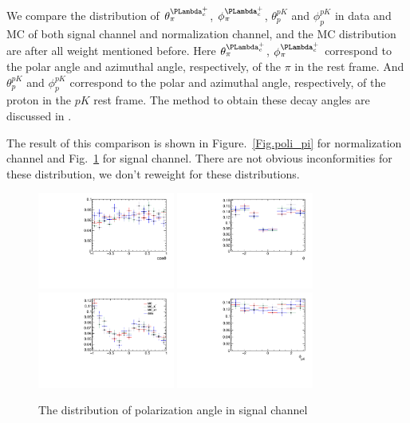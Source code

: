 We compare the distribution of $\theta_{\pi}^{\Lc}$, $\phi_{\pi}^{\Lc}$, $\theta_{p}^{pK}$ and $\phi_{p}^{pK}$ 
in data and MC of both signal channel and normalization channel, 
and the MC distribution are after all weight mentioned before. 
Here $\theta_{\pi}^{\Lc}$, $\phi_{\pi}^{\Lc}$ correspond to the polar angle and azimuthal angle, 
respectively, of the $\pi$ in the \Lc rest frame. 
And $\theta_{p}^{pK}$ and $\phi_{p}^{pK}$ correspond to the polar and azimuthal angle, respectively, 
of the proton in the $pK$ rest frame. 
The method to obtain these decay angles are discussed in \cite{LHCb-PAPER-2015-029}.

The result of this comparison is shown in Figure.~\ref{Fig.poli_pi} for normalization channel and Fig.~\ref{Fig.poli_kkpi} for signal channel. 
There are not obvious inconformities for these distribution, we don't reweight for these distributions.

\begin{figure}[bth]
\centering
\includegraphics[width=0.4\textwidth]{Figures/05_open_charm/04_tune/poli/kkpi_poli/cosTheta.pdf}%
\includegraphics[width=0.4\textwidth]{Figures/05_open_charm/04_tune/poli/kkpi_poli/phi.pdf}\\
\includegraphics[width=0.4\textwidth]{Figures/05_open_charm/04_tune/poli/kkpi_poli/cosTheta_pk.pdf}%
\includegraphics[width=0.4\textwidth]{Figures/05_open_charm/04_tune/poli/kkpi_poli/phi_pk.pdf}\\
	\caption{ The distribution of polarization angle in signal channel}
\label{Fig.poli_kkpi}
\end{figure}


